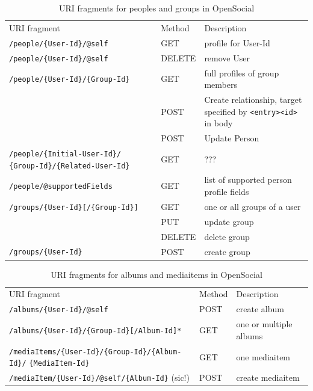 \documentclass[11pt,a4paper,headsepline,twoside]{scrartcl}		%
\begin{document}
\begin{table}[tbh]
\begin{tabular}{p{6.5cm} l p{10cm}}
  URI fragment & Method & Description \\
  \verb:/people/{User-Id}/@self: & GET & profile for User-Id \\
  \verb:/people/{User-Id}/@self: & DELETE & remove User \\
  \verb:/people/{User-Id}/{Group-Id}: & GET & full profiles of group members \\
  \verb:: & POST & Create relationship, target specified \newline by \verb:<entry><id>: in body \\
   & POST & Update Person \\
  \verb:/people/{Initial-User-Id}/: \newline \verb:{Group-Id}/{Related-User-Id}: & GET & ??? \\
  \verb:/people/@supportedFields: & GET & list of supported person profile fields \\
  \verb:/groups/{User-Id}[/{Group-Id}]: & GET & one or all groups of a user \\
   & PUT & update group \\
   & DELETE & delete group \\
  \verb:/groups/{User-Id}: & POST & create group \\
\end{tabular}
  \caption{URI fragments for peoples and groups in OpenSocial}
  \label{tab:OSURIPersons}
\end{table}

\begin{table}[tbh]
\begin{tabular}{p{9.5cm} l p{8cm}}
  URI fragment & Method & Description \\
  \verb:/albums/{User-Id}/@self: & POST & create album \\
  \verb:/albums/{User-Id}/{Group-Id}[/Album-Id]*: & GET & one or multiple albums \\
  \verb:/mediaItems/{User-Id}/{Group-Id}/{Album-Id}/: \newline \verb:{MediaItem-Id}: & GET & one mediaitem \\
  \verb:/mediaItem/{User-Id}/@self/{Album-Id}: (sic!) & POST & create mediaitem \\
\end{tabular}
  \caption{URI fragments for albums and mediaitems in OpenSocial}
  \label{tab:OSURIAlbums}
\end{table}
\end{document}
